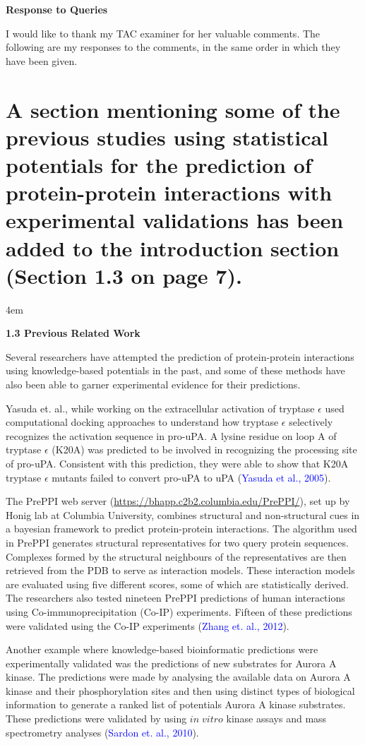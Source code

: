 \documentclass[a4paper, 12pt, twoside]{article}
\begin{document}
\textbf{Response to Queries}

I would like to thank my TAC examiner for her valuable comments. The following are my responses to the comments, in the same order in which they have been given.
\section{A section mentioning some of the previous studies using statistical potentials for the prediction of protein-protein interactions with experimental validations has been added to the introduction section (Section 1.3 on page 7).}
	
\par
\begingroup
\footnotesize
\leftskip4em
\rightskip\leftskip

\noindent \textbf{1.3 Previous Related Work}

Several researchers have attempted the prediction of protein-protein interactions using knowledge-based potentials in the past, and some of these methods have also been able  to garner experimental evidence for their predictions. 

Yasuda et. al., while working on the extracellular activation of tryptase $\epsilon$ used computational docking approaches to understand how tryptase $\epsilon$ selectively recognizes the activation sequence in pro-uPA. A lysine residue on loop A of tryptase $\epsilon$ (K20A) was predicted to be involved in recognizing the processing site of pro-uPA. Consistent with this prediction, they were able to show that K20A tryptase $\epsilon$ mutants failed to convert pro-uPA to uPA (\textcolor{blue}{Yasuda et al., 2005}).

The PrePPI web server (\url{https://bhapp.c2b2.columbia.edu/PrePPI/}), set up by Honig lab at Columbia University, combines structural and non-structural cues in a bayesian framework to predict protein-protein interactions. The algorithm used in PrePPI generates structural representatives for two query protein sequences. Complexes formed by the structural neighbours of the representatives are then retrieved from the PDB to serve as interaction models. These interaction models are evaluated using five different scores, some of which are statistically derived. The researchers also tested nineteen PrePPI predictions of human interactions using Co-immunoprecipitation (Co-IP) experiments. Fifteen of these predictions were validated using the Co-IP experiments (\textcolor{blue}{Zhang et. al., 2012}).

Another example where knowledge-based bioinformatic predictions were experimentally validated was the predictions of new substrates for Aurora A kinase. The predictions were made by analysing the available data on Aurora A kinase and their phosphorylation sites and then using distinct types of biological information to generate a ranked list of potentials Aurora A kinase substrates. These predictions were validated by using $in \; vitro$ kinase assays and mass spectrometry analyses (\textcolor{blue}{Sardon et. al., 2010}).
\par
\endgroup
\end{document}
